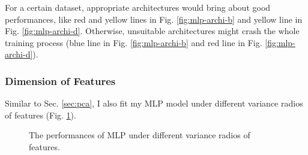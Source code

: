 \documentclass[12pt,a4paper]{article}
\theoremstyle{definition}
\begin{document}
For a certain dataset, appropriate architectures would bring about good performances, like red and yellow lines in Fig. \ref{fig:mlp-archi-b} and yellow line in Fig. \ref{fig:mlp-archi-d}. Otherwise, unsuitable architectures might crash the whole training process (blue line in Fig. \ref{fig:mlp-archi-b} and red line in Fig. \ref{fig:mlp-archi-d}).

\subsubsection{Dimension of Features}

Similar to Sec. \ref{sec:pca}, I also fit my MLP model under different variance radios of features (Fig. \ref{fig:mlp-dim}).

\begin{figure}[H]
	\centering
	\caption{The performances of MLP under different variance radios of features.}
	\label{fig:mlp-dim}
\end{figure}
\end{document}
